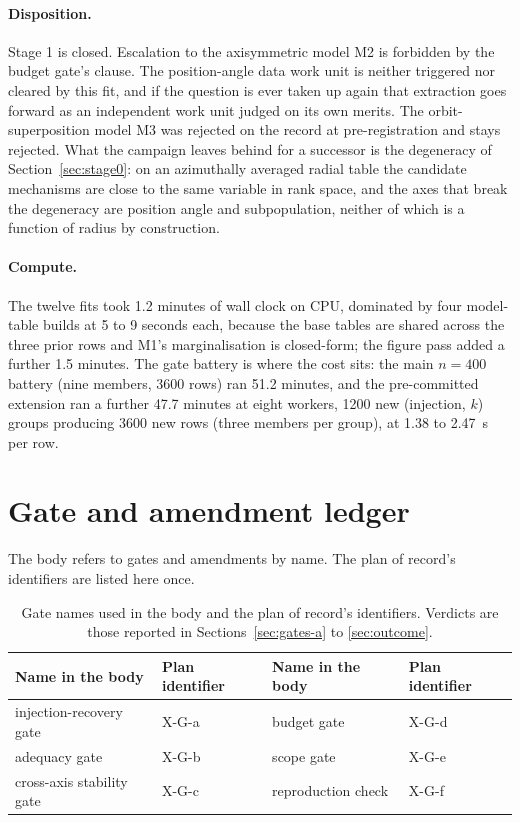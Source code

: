 \documentclass[11pt]{article}
\begin{document}
\paragraph{Disposition.} Stage 1 is closed. Escalation to the axisymmetric model M2 is forbidden by the budget gate's clause. The position-angle data work unit is neither triggered nor cleared by this fit, and if the question is ever taken up again that extraction goes forward as an independent work unit judged on its own merits. The orbit-superposition model M3 was rejected on the record at pre-registration and stays rejected. What the campaign leaves behind for a successor is the degeneracy of Section~\ref{sec:stage0}: on an azimuthally averaged radial table the candidate mechanisms are close to the same variable in rank space, and the axes that break the degeneracy are position angle and subpopulation, neither of which is a function of radius by construction.

\paragraph{Compute.} The twelve fits took 1.2 minutes of wall clock on CPU, dominated by four model-table builds at 5 to 9 seconds each, because the base tables are shared across the three prior rows and M1's marginalisation is closed-form; the figure pass added a further 1.5 minutes. The gate battery is where the cost sits: the main $n = 400$ battery (nine members, 3600 rows) ran 51.2 minutes, and the pre-committed extension ran a further 47.7 minutes at eight workers, 1200 new (injection, $k$) groups producing 3600 new rows (three members per group), at 1.38 to 2.47~s per row.

\appendix

\section{Gate and amendment ledger}
\label{app:ledger}

The body refers to gates and amendments by name. The plan of record's identifiers are listed here once.

\begin{table}[htbp]
\centering
\small
\caption{Gate names used in the body and the plan of record's identifiers. Verdicts are those reported in Sections~\ref{sec:gates-a} to \ref{sec:outcome}.}
\label{tab:gateids}
\begin{tabular}{llll}
\toprule
Name in the body & Plan identifier & Name in the body & Plan identifier \\
\midrule
injection-recovery gate & X-G-a & budget gate & X-G-d \\
adequacy gate & X-G-b & scope gate & X-G-e \\
cross-axis stability gate & X-G-c & reproduction check & X-G-f \\
\bottomrule
\end{tabular}
\end{table}
\end{document}
